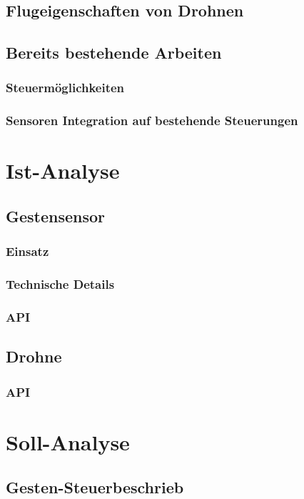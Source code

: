 \subsection{Flugeigenschaften von Drohnen}


\subsection{Bereits bestehende Arbeiten}

\subsubsection{Steuermöglichkeiten}

\subsubsection{Sensoren Integration auf bestehende Steuerungen}


\section{Ist-Analyse}
\subsection{Gestensensor}

\subsubsection{Einsatz}

\subsubsection{Technische Details}

\subsubsection{API}


\subsection{Drohne}

\subsubsection{API}


\section{Soll-Analyse}
\subsection{Gesten-Steuerbeschrieb}


